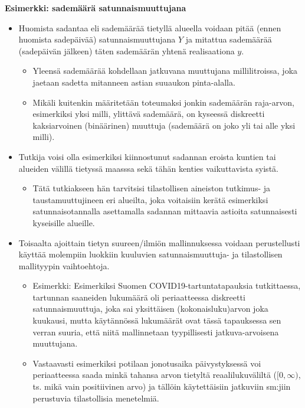 \documentclass[
]{book}
\providecommand{\tightlist}{%
  \setlength{\itemsep}{0pt}\setlength{\parskip}{0pt}}
\begin{document}
\begin{eblock}{}

\textbf{Esimerkki: sademäärä satunnaismuuttujana}

\begin{itemize}
\tightlist
\item
  Huomista sadantaa eli sademäärää tietyllä alueella voidaan pitää (ennen huomista sadepäivää) satunnaismuuttujana \(Y\) ja mitattua sademäärää (sadepäivän jälkeen) täten sademäärän yhtenä realisaationa \(y\).

  \begin{itemize}
  \tightlist
  \item
    Yleensä sademäärää kohdellaan jatkuvana muuttujana millilitroissa, joka jaetaan sadetta mitanneen astian suuaukon pinta-alalla.
  \item
    Mikäli kuitenkin määritetään toteumaksi jonkin sademäärän raja-arvon, esimerkiksi yksi milli, ylittävä sademäärä, on kyseessä diskreetti kaksiarvoinen (binäärinen) muuttuja (sademäärä on joko yli tai alle yksi milli).
  \end{itemize}
\item
  Tutkija voisi olla esimerkiksi kiinnostunut sadannan eroista kuntien tai alueiden välillä tietyssä maasssa sekä tähän kenties vaikuttavista syistä.

  \begin{itemize}
  \tightlist
  \item
    Tätä tutkiakseen hän tarvitsisi tilastollisen aineiston tutkimus- ja taustamuuttujineen eri alueilta, joka voitaisiin kerätä esimerkiksi satunnaisotannalla asettamalla sadannan mittaavia astioita satunnaisesti kyseisille alueille.
  \end{itemize}
\end{itemize}

\end{eblock}

\begin{itemize}
\tightlist
\item
  Toisaalta ajoittain tietyn suureen/ilmiön mallinnuksessa voidaan perustellusti käyttää molempiin luokkiin kuuluvien satunnaismuuttuja- ja tilastollisen mallityypin vaihtoehtoja.

  \begin{itemize}
  \tightlist
  \item
    Esimerkki: Esimerkiksi Suomen COVID19-tartuntatapauksia tutkittaessa, tartunnan saaneiden lukumäärä oli periaatteessa diskreetti satunnaismuuttuja, joka sai yksittäisen (kokonaisluku)arvon joka kuukausi, mutta käytännössä lukumäärät ovat tässä tapauksessa sen verran suuria, että niitä mallinnetaan tyypillisesti jatkuva-arvoisena muuttujana.
  \item
    Vastaavasti esimerkiksi potilaan jonotusaika päivystyksessä voi periaatteessa saada minkä tahansa arvon tietyltä reaalilukuväliltä (\([0,\infty)\), ts. mikä vain positiivinen arvo) ja tällöin käytettäisiin jatkuviin sm:jiin perustuvia tilastollisia menetelmiä.
  \end{itemize}
\end{itemize}
\end{document}
